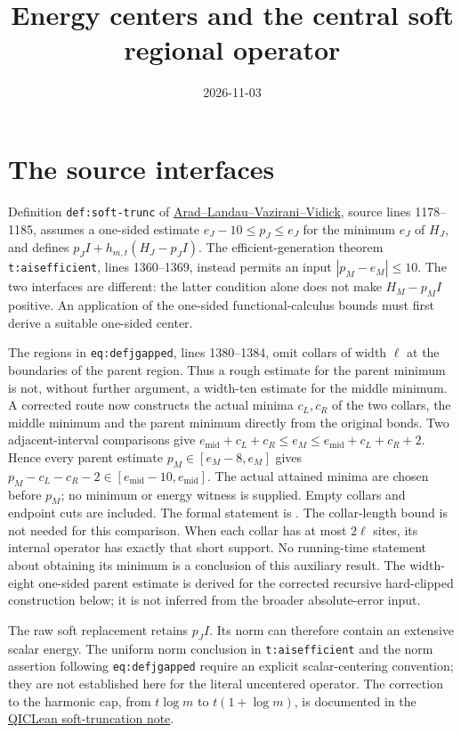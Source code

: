 \documentclass{article}
\title{Energy centers and the central soft regional operator}
\author{}
\date{2026-11-03}
\begin{document}
\maketitle
{}

\section{The source interfaces}

Definition \texttt{def:soft-trunc} of
\href{https://arxiv.org/abs/1602.08828v2}{Arad--Landau--Vazirani--Vidick},
source lines 1178--1185, assumes a one-sided estimate
$e_J-10\le p_J\le e_J$ for the minimum $e_J$ of $H_J$, and defines
$p_JI+h_{m,t}(H_J-p_JI)$. The efficient-generation theorem
\texttt{t:aisefficient}, lines 1360--1369, instead permits an input
$|p_M-e_M|\le10$. The two interfaces are different: the latter condition
alone does not make $H_M-p_MI$ positive. An application of the one-sided
functional-calculus bounds must first derive a suitable one-sided center.

The regions in \texttt{eq:defjgapped}, lines 1380--1384, omit collars of
width $\ell$ at the boundaries of the parent region. Thus a rough
estimate for the parent minimum is not, without further argument, a
width-ten estimate for the middle minimum. A corrected route
now constructs the actual minima $c_L,c_R$ of the two collars, the
middle minimum and the parent minimum directly from the original bonds.
Two adjacent-interval comparisons give
$e_{\mathrm{mid}}+c_L+c_R\le e_M\le e_{\mathrm{mid}}+c_L+c_R+2$.
Hence every parent estimate $p_M\in[e_M-8,e_M]$ gives
$p_M-c_L-c_R-2\in[e_{\mathrm{mid}}-10,e_{\mathrm{mid}}]$.
The actual attained minima are chosen before $p_M$; no minimum or
energy witness is supplied. Empty collars and endpoint cuts are included.
The formal statement is
.
The collar-length bound is not needed for this comparison. When each
collar has at most $2\ell$ sites, its internal operator has exactly that
short support. No running-time statement about obtaining its minimum
is a conclusion of this auxiliary result. The width-eight one-sided
parent estimate is derived for the corrected recursive hard-clipped
construction below; it is not inferred from the broader absolute-error input.

The raw soft replacement retains $p_JI$. Its norm can therefore contain
an extensive scalar energy. The uniform norm conclusion in
\texttt{t:aisefficient} and the norm assertion following
\texttt{eq:defjgapped} require an explicit scalar-centering convention;
they are not established here for the literal uncentered operator.
The correction to the harmonic cap, from $t\log m$ to $t(1+\log m)$,
is documented in the
\href{https://sirui-lu.com/QICLean/paper-gaps/alvv16_soft_truncation_log_bound.pdf}{QICLean soft-truncation note}.
\end{document}
